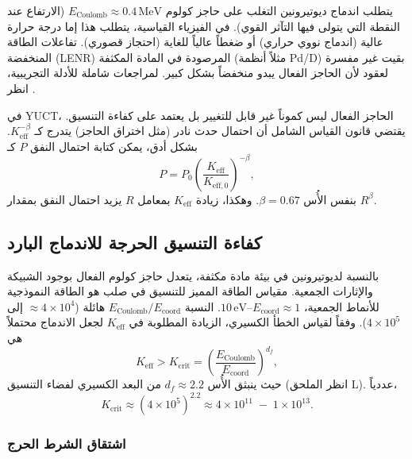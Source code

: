 \documentclass[11pt,a4paper]{article}
\newcommand{\Keff}{K_{\mathrm{eff}}}
\newcommand{\Keffzero}{K_{\mathrm{eff},0}}
\newcommand{\df}{d_{\!f}}
\newcommand{\Kcrit}{K_{\mathrm{crit}}}
\theoremstyle{remark}
\begin{document}
	يتطلب اندماج ديوتيرونين التغلب على حاجز كولوم \(E_{\text{Coulomb}} \approx 0.4\,\text{MeV}\) (الارتفاع عند النقطة التي يتولى فيها التآثر القوي). في الفيزياء القياسية، يتطلب هذا إما درجة حرارة عالية (اندماج نووي حراري) أو ضغطاً عالياً للغاية (احتجاز قصوري). تفاعلات الطاقة المنخفضة (LENR) المرصودة في المادة المكثفة (مثلاً أنظمة Pd/D) بقيت غير مفسرة لعقود لأن الحاجز الفعال يبدو منخفضاً بشكل كبير. لمراجعات شاملة للأدلة التجريبية، انظر \cite{Storms2014, Nagel2019}.
	
	في YUCT، الحاجز الفعال ليس كموناً غير قابل للتغيير بل يعتمد على كفاءة التنسيق. يقتضي قانون القياس الشامل أن احتمال حدث نادر (مثل اختراق الحاجز) يتدرج كـ \(\Keff^{-\beta}\). بشكل أدق، يمكن كتابة احتمال النفق \(P\) كـ
	\begin{equation}
		P = P_0 \left( \frac{\Keff}{\Keffzero} \right)^{-\beta},
		\label{eq:tunnel}
	\end{equation}
	بنفس الأُس \(\beta = 0.67\). وهكذا، زيادة \(\Keff\) بمعامل \(R\) يزيد احتمال النفق بمقدار \(R^{\beta}\).
	
	\subsection{كفاءة التنسيق الحرجة للاندماج البارد}
	
	بالنسبة لديوتيرونين في بيئة مادة مكثفة، يتعدل حاجز كولوم الفعال بوجود الشبيكة والإثارات الجمعية. مقياس الطاقة المميز للتنسيق في صلب هو الطاقة النموذجية للأنماط الجمعية، \(E_{\mathrm{coord}} \approx 1\)–\(10\,\text{eV}\). النسبة \(E_{\text{Coulomb}}/E_{\mathrm{coord}}\) هائلة (\(\approx 4\times10^4\) إلى \(4\times10^5\)). وفقاً لقياس الخطأ الكسيري، الزيادة المطلوبة في \(\Keff\) لجعل الاندماج محتملاً هي
	\begin{equation}
		\Keff > \Kcrit = \left( \frac{E_{\text{Coulomb}}}{E_{\mathrm{coord}}} \right)^{\df},
		\label{eq:Kcrit}
	\end{equation}
	حيث ينبثق الأُس \(\df \approx 2.2\) من البعد الكسيري لفضاء التنسيق (انظر الملحق L). عددياً،
	\[
	\Kcrit \approx (4\times10^5)^{2.2} \approx 4\times10^{11} \;-\; 1\times10^{13}.
	\]
	
	\subsubsection{اشتقاق الشرط الحرج}
	
\end{document}
